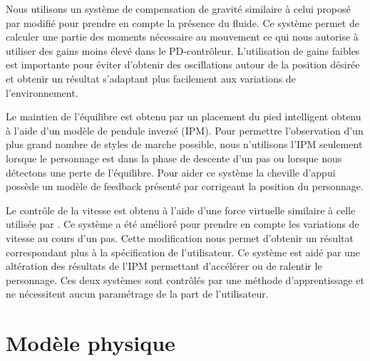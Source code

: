 \documentclass[runningheads,a4paper]{llncs}
\begin{document}
Nous utilisons un système de compensation de gravité similaire à celui proposé par \cite{coros2010generalized} modifié pour prendre en compte la présence du fluide. Ce système permet de calculer une partie des moments nécessaire au mouvement ce qui nous autorise à utiliser des gains moins élevé dans le PD-contrôleur. L'utilisation de gains faibles est importante pour éviter d'obtenir des oscillations autour de la position désirée et obtenir un résultat s'adaptant plus facilement aux variations de l'environnement.

Le maintien de l'équilibre est obtenu par un placement du pied intelligent obtenu à l'aide d'un modèle de pendule inversé (IPM). Pour permettre l'observation d'un plus grand nombre de styles de marche possible, nous n'utilisons l'IPM seulement lorsque le personnage est dans la phase de descente d'un pas ou lorsque nous détectons une perte de l'équilibre. Pour aider ce système la cheville d'appui possède un modèle de feedback présenté par \cite{yin2007simbicon} corrigeant la position du personnage.

Le contrôle de la vitesse est obtenu à l'aide d'une force virtuelle similaire à celle utilisée par \cite{coros2010generalized}. Ce système a été amélioré pour prendre en compte les variations de vitesse au cours d'un pas. Cette modification nous permet d'obtenir un résultat correspondant plus à la spécification de l'utilisateur. Ce système est aidé par une altération des résultats de l'IPM permettant d'accélérer ou de ralentir le personnage. Ces deux systèmes sont contrôlés par une méthode d'apprentissage et ne nécessitent aucun paramétrage de la part de l'utilisateur.

%
\section{Modèle physique}
\end{document}

